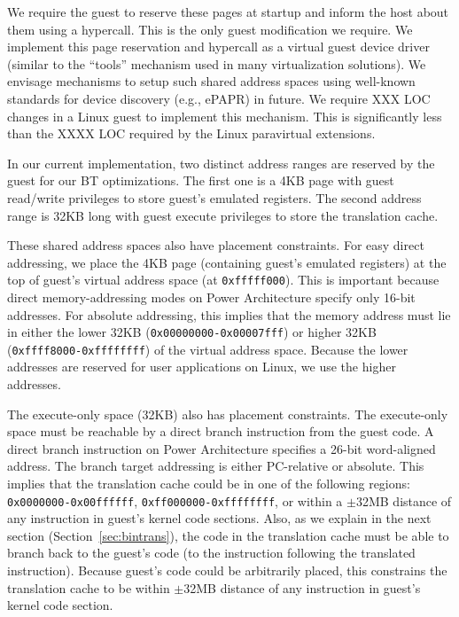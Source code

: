 \documentclass[10pt,twocolumn]{article}
\begin{document}
We require the guest to reserve these pages at startup and inform the host about
them using a hypercall.
This is the only guest modification we require.
We implement this page reservation
and hypercall as a virtual guest device driver (similar to the ``tools'' mechanism
used in many virtualization solutions). We envisage mechanisms to setup
such shared address spaces using well-known standards for device
discovery (e.g., ePAPR\cite{ePAPR}) in future.
We require XXX LOC changes in a Linux guest to implement this mechanism. This is
significantly less than the XXXX LOC required by the Linux paravirtual
extensions.

In our current implementation, two distinct address ranges are reserved by the
guest for our BT optimizations.
The first one is a 4KB page with guest read/write privileges
to store guest's emulated registers.  The second address range is 32KB long
with guest execute privileges to store the translation cache.

These shared address spaces also have placement constraints. For easy direct
addressing, we place the 4KB page (containing guest's emulated registers) at
the top of guest's virtual address space (at {\tt 0xfffff000}). This is important 
because direct memory-addressing modes on Power Architecture specify only 16-bit
addresses. For absolute addressing, this implies that the memory
address must lie in either
the lower 32KB ({\tt 0x00000000-0x00007fff}) or higher
32KB ({\tt 0xffff8000-0xffffffff}) of the virtual address space. Because the lower
addresses are reserved for user applications on Linux, we use the higher addresses.

The execute-only space (32KB) also has placement
constraints. The execute-only space must be reachable
by a direct branch instruction from the guest code. A direct branch instruction
on Power Architecture specifies a 26-bit
word-aligned address. The branch target addressing is either PC-relative
or absolute. This implies that the translation cache could be
in one of the following regions: {\tt 0x0000000-0x00ffffff}, {\tt 0xff000000-0xffffffff},
or within a $\pm$32MB distance of any instruction in guest's kernel code sections.
Also, as we explain in the
next section (Section~\ref{sec:bintrans}), the code in the translation cache must
be able to branch
back to the guest's code (to the instruction following the translated instruction).
Because guest's code could be arbitrarily placed, this constrains the translation
cache to be within $\pm$32MB distance of any instruction in
guest's kernel code section.
\end{document}
